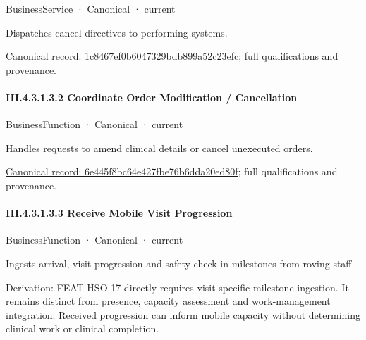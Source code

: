 \label{element:1c8467ef0b6047329bdb899a52c23efc}
{\small BusinessService · Canonical · current}\par

Dispatches cancel directives to performing systems.


{\footnotesize \href{../../../../../../../../continuum/business/business-service/1c8467ef0b6047329bdb899a52c23efc.md}{Canonical record: 1c8467ef0b6047329bdb899a52c23efc}; full qualifications and provenance.}\par
\paragraph*{III.4.3.1.3.2 Coordinate Order Modification / Cancellation}
\label{navigation:III.4.3.1.3.2}

\label{element:6e445f8bc64e427fbe76b6dda20ed80f}
{\small BusinessFunction · Canonical · current}\par

Handles requests to amend clinical details or cancel unexecuted orders.


{\footnotesize \href{../../../../../../../../continuum/business/business-function/6e445f8bc64e427fbe76b6dda20ed80f.md}{Canonical record: 6e445f8bc64e427fbe76b6dda20ed80f}; full qualifications and provenance.}\par
\paragraph*{III.4.3.1.3.3 Receive Mobile Visit Progression}
\label{navigation:III.4.3.1.3.3}

\label{element:71700f211ef4403f98a2b9b11d8d7848}
{\small BusinessFunction · Canonical · current}\par

Ingests arrival, visit-progression and safety check-in milestones from roving staff.



Derivation: FEAT-HSO-17 directly requires visit-specific milestone ingestion. It remains distinct from presence, capacity assessment and work-management integration. Received progression can inform mobile capacity without determining clinical work or clinical completion.


